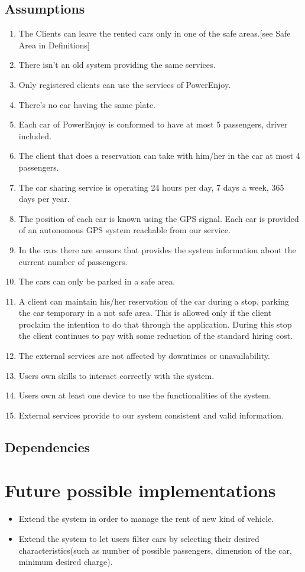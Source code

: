 \subsection{Assumptions}
\begin{enumerate}[label=\textbf{A\arabic*)}]
\item The Clients can leave the rented cars only in one of the safe areas.[see Safe Area in Definitions]
\item There isn’t an old system providing the same services.
\item Only registered clients can use the services of PowerEnjoy.
\item There’s no car having the same plate.
\item Each car of PowerEnjoy is conformed to have at most 5 passengers, driver included.
\item The client that does a reservation can take with him/her in the car at most 4 passengers.
\item The car sharing service is operating 24 hours per day, 7 days a week, 365 days per year.
\item The position of each car is known using the GPS signal. Each car is provided of an autonomous GPS system reachable from our service.
\item In the cars there are sensors that provides the system information about the current number of passengers.
\item The cars can only be parked in a safe area.
\item A client can maintain his/her reservation of the car during a stop, parking the car temporary in a not safe area. This is allowed only if the client proclaim the intention to do that through the application. During this stop the client continues to pay with some reduction of the standard hiring cost.
\item The external services are not affected by downtimes or unavailability.
\item Users own skills to interact correctly with the system.
\item Users own at least one device to use the functionalities of the system.
\item External services provide to our system consistent and valid information.
\end{enumerate}

\subsection{Dependencies}

\section{Future possible implementations}
\begin{itemize}
\item Extend  the system in order to manage the rent of new kind of vehicle.
\item Extend the system to let users filter cars by selecting their desired characteristics(such as number of possible passengers, dimension of the car, minimum desired charge).
\end{itemize}